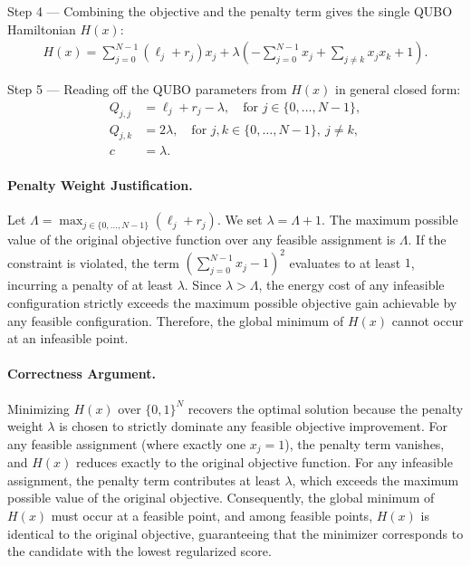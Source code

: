 \documentclass[12pt]{article}
\begin{document}
Step 4 --- Combining the objective and the penalty term gives the single QUBO Hamiltonian $H(x)$:
\begin{align}
H(x) = \sum_{j=0}^{N-1} (\ell_j + r_j) x_j + \lambda \left( -\sum_{j=0}^{N-1} x_j + \sum_{j \neq k} x_j x_k + 1 \right).
\end{align}

Step 5 --- Reading off the QUBO parameters from $H(x)$ in general closed form:
\begin{align}
Q_{j,j} &= \ell_j + r_j - \lambda, \quad \text{for } j \in \{0, \dots, N-1\}, \\
Q_{j,k} &= 2\lambda, \quad \text{for } j, k \in \{0, \dots, N-1\}, \ j \neq k, \\
c &= \lambda.
\end{align}

\paragraph{Penalty Weight Justification.}
Let $\Lambda = \max_{j \in \{0, \dots, N-1\}} (\ell_j + r_j)$. We set $\lambda = \Lambda + 1$. The maximum possible value of the original objective function over any feasible assignment is $\Lambda$. If the constraint is violated, the term $\left( \sum_{j=0}^{N-1} x_j - 1 \right)^2$ evaluates to at least $1$, incurring a penalty of at least $\lambda$. Since $\lambda > \Lambda$, the energy cost of any infeasible configuration strictly exceeds the maximum possible objective gain achievable by any feasible configuration. Therefore, the global minimum of $H(x)$ cannot occur at an infeasible point.

\paragraph{Correctness Argument.}
Minimizing $H(x)$ over $\{0,1\}^N$ recovers the optimal solution because the penalty weight $\lambda$ is chosen to strictly dominate any feasible objective improvement. For any feasible assignment (where exactly one $x_j=1$), the penalty term vanishes, and $H(x)$ reduces exactly to the original objective function. For any infeasible assignment, the penalty term contributes at least $\lambda$, which exceeds the maximum possible value of the original objective. Consequently, the global minimum of $H(x)$ must occur at a feasible point, and among feasible points, $H(x)$ is identical to the original objective, guaranteeing that the minimizer corresponds to the candidate with the lowest regularized score.
\end{document}
